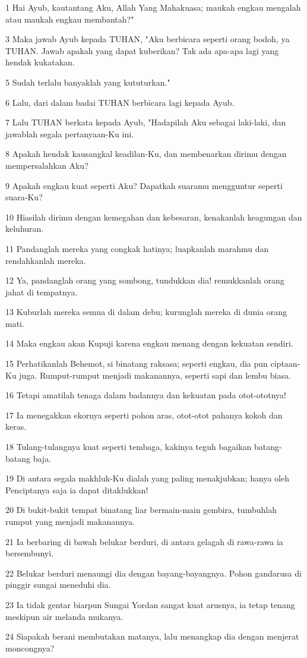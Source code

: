 \par 1 Hai Ayub, kautantang Aku, Allah Yang Mahakuasa; maukah engkau mengalah atau maukah engkau membantah?"
\par 3 Maka jawab Ayub kepada TUHAN, "Aku berbicara seperti orang bodoh, ya TUHAN. Jawab apakah yang dapat kuberikan? Tak ada apa-apa lagi yang hendak kukatakan.
\par 5 Sudah terlalu banyaklah yang kututurkan."
\par 6 Lalu, dari dalam badai TUHAN berbicara lagi kepada Ayub.
\par 7 Lalu TUHAN berkata kepada Ayub, "Hadapilah Aku sebagai laki-laki, dan jawablah segala pertanyaan-Ku ini.
\par 8 Apakah hendak kausangkal keadilan-Ku, dan membenarkan dirimu dengan mempersalahkan Aku?
\par 9 Apakah engkau kuat seperti Aku? Dapatkah suaramu mengguntur seperti suara-Ku?
\par 10 Hiasilah dirimu dengan kemegahan dan kebesaran, kenakanlah keagungan dan keluhuran.
\par 11 Pandanglah mereka yang congkak hatinya; luapkanlah marahmu dan rendahkanlah mereka.
\par 12 Ya, pandanglah orang yang sombong, tundukkan dia! remukkanlah orang jahat di tempatnya.
\par 13 Kuburlah mereka semua di dalam debu; kurunglah mereka di dunia orang mati.
\par 14 Maka engkau akan Kupuji karena engkau menang dengan kekuatan sendiri.
\par 15 Perhatikanlah Behemot, si binatang raksasa; seperti engkau, dia pun ciptaan-Ku juga. Rumput-rumput menjadi makanannya, seperti sapi dan lembu biasa.
\par 16 Tetapi amatilah tenaga dalam badannya dan kekuatan pada otot-ototnya!
\par 17 Ia menegakkan ekornya seperti pohon aras, otot-otot pahanya kokoh dan keras.
\par 18 Tulang-tulangnya kuat seperti tembaga, kakinya teguh bagaikan batang-batang baja.
\par 19 Di antara segala makhluk-Ku dialah yang paling menakjubkan; hanya oleh Penciptanya saja ia dapat ditaklukkan!
\par 20 Di bukit-bukit tempat binatang liar bermain-main gembira, tumbuhlah rumput yang menjadi makanannya.
\par 21 Ia berbaring di bawah belukar berduri, di antara gelagah di rawa-rawa ia bersembunyi.
\par 22 Belukar berduri menaungi dia dengan bayang-bayangnya. Pohon gandarusa di pinggir sungai meneduhi dia.
\par 23 Ia tidak gentar biarpun Sungai Yordan sangat kuat arusnya, ia tetap tenang meskipun air melanda mukanya.
\par 24 Siapakah berani membutakan matanya, lalu menangkap dia dengan menjerat moncongnya?

